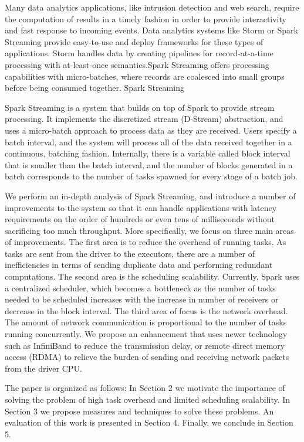 \noindent

Many data analytics applications, like intrusion detection and web search, require the computation of results in a timely fashion in order to provide interactivity and fast response to incoming events.
Data analytics systems like Storm or Spark Streaming provide easy-to-use and deploy frameworks for these types of applications. Storm handles data by creating pipelines for record-at-a-time processing with at-least-once semantics.Spark Streaming offers processing capabilities with micro-batches, where records are coalesced into small groups before being consumed together.
Spark Streaming 


Spark Streaming is a system that builds on top of Spark to provide stream processing. It implements the discretized stream (D-Stream) abstraction, and uses a micro-batch approach to process data as they are received. Users specify a batch interval, and the system will process all of the data received together in a continuous, batching fashion. Internally, there is a variable called block interval that is smaller than the batch interval, and the number of blocks generated in a batch corresponds to the number of tasks spawned for every stage of a  batch job.

We perform an in-depth analysis of Spark Streaming, and introduce a number of improvements to the system so that it can handle applications with latency requirements on the order of hundreds or even tens of milliseconds without sacrificing too much throughput. More specifically, we focus on three main areas of improvements. The first area is to reduce the overhead of running tasks. As tasks are sent from the driver to the executors, there are a number of inefficiencies in terms of sending duplicate data and performing redundant computations. The second area is the scheduling scalability. Currently, Spark uses a centralized scheduler, which becomes a bottleneck as the number of tasks needed to be scheduled increases with the increase in number of receivers or decrease in the block interval. The third area of focus is the network overhead. The amount of network communication is proportional to the number of tasks running concurrently. We propose an enhancement that uses newer technology such as InfiniBand to reduce the transmission delay, or remote direct memory access (RDMA) to relieve the burden of sending and receiving network packets from the driver CPU.

The paper is organized as follows: In Section 2 we motivate the importance of solving the problem of high task overhead and limited scheduling scalability. In Section 3 we propose measures and techniques to solve these problems. An evaluation of this work is presented in Section 4. Finally, we conclude in Section 5.

